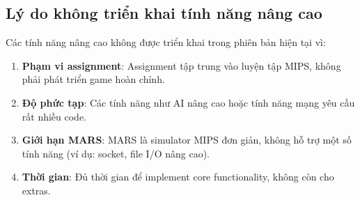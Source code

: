 \subsection{Lý do không triển khai tính năng nâng cao}

Các tính năng nâng cao không được triển khai trong phiên bản hiện tại vì:

\begin{enumerate}
    \item \textbf{Phạm vi assignment}: Assignment tập trung vào luyện tập MIPS, không phải phát triển game hoàn chỉnh.
    
    \item \textbf{Độ phức tạp}: Các tính năng như AI nâng cao hoặc tính năng mạng yêu cầu rất nhiều code.
    
    \item \textbf{Giới hạn MARS}: MARS là simulator MIPS đơn giản, không hỗ trợ một số tính năng (ví dụ: socket, file I/O nâng cao).
    
    \item \textbf{Thời gian}: Đủ thời gian để implement core functionality, không còn cho extras.
\end{enumerate}
